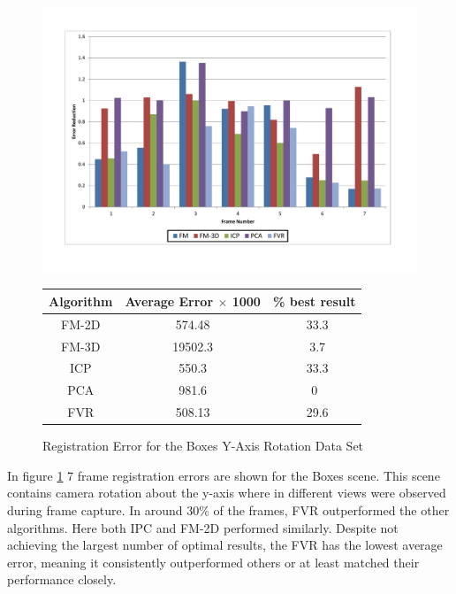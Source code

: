 \begin{figure}
\centering
\includegraphics[width=6in]{images/results/Boxes_Texture_Rotate}
\caption{Registration Error for the Boxes Y-Axis Rotation Data Set}
\label{fig:PET2}

\begin{tabular}{ccc}
\hline
\textbf{Algorithm} & \textbf{Average Error $\times$ 1000} & \textbf{\% best result}\\ \hline
FM-2D	& 574.48 & ~33.3\\
FM-3D	& 19502.3 & ~3.7\\
ICP		& 550.3 & ~33.3\\
PCA		& 981.6 & 0\\
FVR		& 508.13 & ~29.6\\
\end{tabular}
\end{figure} 





In figure \ref{fig:PET2} 7 frame registration errors are shown for the Boxes scene. This scene contains camera rotation about the y-axis where in different views were observed during frame capture. In around 30\% of the frames, FVR outperformed the other algorithms. Here both IPC and FM-2D performed similarly. Despite not achieving the largest number of optimal results, the FVR has the lowest average error, meaning it consistently outperformed others or at least matched their performance closely.  \\



